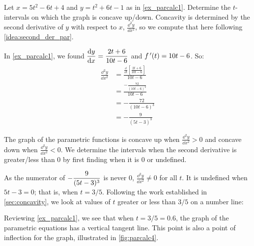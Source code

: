\begin{example}\label{ex_parcalc4}%
Let $x=5t^2-6t+4$ and $y=t^2+6t-1$ as in \autoref{ex_parcalc1}. Determine the $t$-intervals on which the graph is concave up/down.
\solution
Concavity is determined by the second derivative of $y$ with respect to $x$, $\frac{\dd^2y}{\dd x^2}$, so we compute that here following \autoref{idea:second_der_par}.

In \autoref{ex_parcalc1}, we found $\displaystyle\frac{\operatorname{d}\! y}{\operatorname{d}\! x} = \frac{2t+6}{10t-6}$ and $f\,'(t) = 10t-6$. So:
\begin{align*}
	\frac{\dd^2y}{\dd x^2}
	&= \frac{\frac{\dd}{\dd t}\left[\frac{2t+6}{10t-6}\right]}{10t-6} \\
	&= \frac{-\frac{72}{(10t-6)^2}}{10t-6}\\
	&= -\frac{72}{(10t-6)^3} \\&= -\frac{9}{(5t-3)^3}
\end{align*}


The graph of the parametric functions is concave up when $\frac{\dd^2y}{\dd x^2} > 0$ and concave down when $\frac{\dd^2y}{\dd x^2} <0$. We determine the intervals when the second derivative is greater/less than 0 by first finding when it is 0 or undefined.

As the numerator of $\displaystyle -\frac{9}{(5t-3)^3}$ is never 0, $\frac{\dd^2y}{\dd x^2} \neq 0$ for all $t$. It is undefined when $5t-3=0$; that is, when $t= 3/5$. Following the work established in \autoref{sec:concavity}, we look at values of $t$ greater or less than $3/5$ on a number line:
\begin{center}
\end{center}

Reviewing \autoref{ex_parcalc1}, we see that when $t=3/5=0.6$, the graph of the parametric equations has a vertical tangent line. This point is also a point of inflection for the graph, illustrated in \autoref{fig:parcalc4}.
\end{example}

